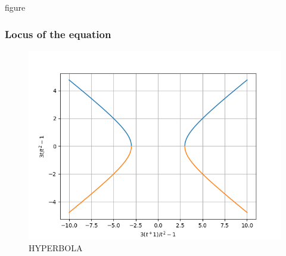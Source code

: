 \documentclass[]{beamer}
\begin{document}
\begin{frame}{figure}
 \frametitle{Locus of the equation}
\begin{figure}
    \centering
    \includegraphics[scale=0.5]{hyp.png}
    \caption{HYPERBOLA}
\end{figure}
\end{frame}
\end{document}
